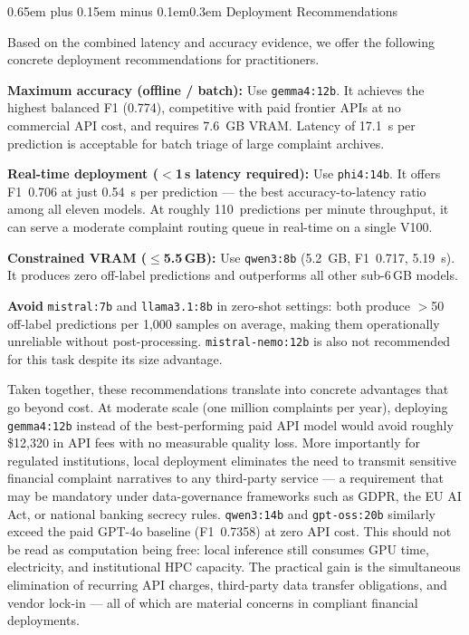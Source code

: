 \documentclass[10pt,a4paper,twocolumn]{article}
\makeatletter
\renewcommand\subsection{\@startsection{subsection}{2}{0pt}%
  {0.65em plus 0.15em minus 0.1em}{0.3em}%
  {\normalfont\normalsize\itshape}}
\makeatother
\begin{document}
\subsection{Deployment Recommendations}

Based on the combined latency and accuracy evidence, we offer the
following concrete deployment recommendations for practitioners.

\textbf{Maximum accuracy (offline / batch):}
Use \texttt{gemma4:12b}. It achieves the highest balanced F1 (0.774),
competitive with paid frontier APIs at no commercial API cost, and requires 7.6~GB VRAM.
Latency of 17.1~s per prediction is acceptable for batch triage of
large complaint archives.

\textbf{Real-time deployment ($<$1\,s latency required):}
Use \texttt{phi4:14b}. It offers F1~0.706 at just 0.54~s per
prediction --- the best accuracy-to-latency ratio among all eleven models.
At roughly 110~predictions per minute throughput, it can serve a
moderate complaint routing queue in real-time on a single V100.

\textbf{Constrained VRAM ($\leq$5.5\,GB):}
Use \texttt{qwen3:8b} (5.2~GB, F1~0.717, 5.19~s). It produces zero
off-label predictions and outperforms all other sub-6\,GB models.

\textbf{Avoid} \texttt{mistral:7b} and \texttt{llama3.1:8b} in
zero-shot settings: both produce $>$50 off-label predictions per
1,000 samples on average, making them operationally unreliable
without post-processing.
\texttt{mistral-nemo:12b} is also not recommended for this task
despite its size advantage.

Taken together, these recommendations translate into concrete
advantages that go beyond cost. At moderate scale (one million
complaints per year), deploying \texttt{gemma4:12b} instead of the
best-performing paid API model would avoid roughly \$12,320 in API
fees with no measurable quality loss. More importantly for regulated
institutions, local deployment eliminates the need to transmit
sensitive financial complaint narratives to any third-party service
--- a requirement that may be mandatory under data-governance
frameworks such as GDPR, the EU AI Act, or national banking secrecy
rules. \texttt{qwen3:14b} and \texttt{gpt-oss:20b} similarly exceed
the paid GPT-4o baseline (F1~0.7358) at zero API cost. This should
not be read as computation being free: local inference still consumes
GPU time, electricity, and institutional HPC capacity. The practical
gain is the simultaneous elimination of recurring API charges,
third-party data transfer obligations, and vendor lock-in --- all
of which are material concerns in compliant financial deployments.
\end{document}
